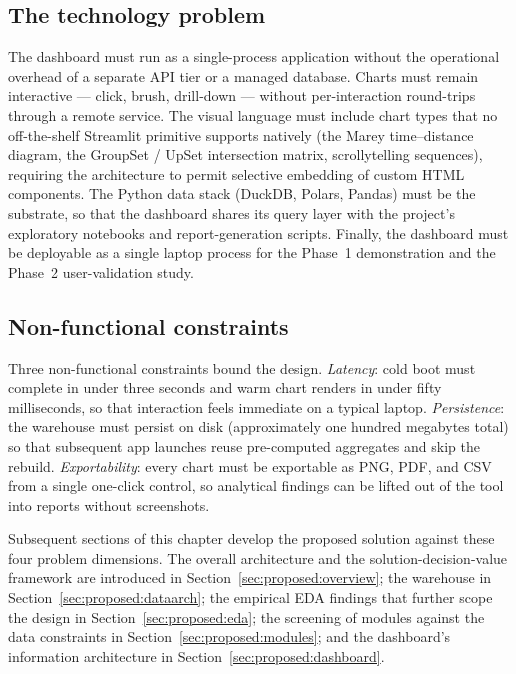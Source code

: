 \subsection{The technology problem}

The dashboard must run as a single-process application without
the operational overhead of a separate API tier or a managed
database. Charts must remain interactive --- click, brush,
drill-down --- without per-interaction round-trips through a
remote service. The visual language must include chart types
that no off-the-shelf Streamlit primitive supports natively (the
Marey time--distance diagram, the GroupSet / UpSet intersection
matrix, scrollytelling sequences), requiring the architecture to
permit selective embedding of custom HTML components. The Python
data stack (DuckDB, Polars, Pandas) must be the substrate, so
that the dashboard shares its query layer with the project's
exploratory notebooks and report-generation scripts. Finally,
the dashboard must be deployable as a single laptop process for
the Phase~1 demonstration and the Phase~2 user-validation study.

\subsection{Non-functional constraints}

Three non-functional constraints bound the design.
\emph{Latency}: cold boot must complete in under three seconds
and warm chart renders in under fifty milliseconds, so that
interaction feels immediate on a typical laptop.
\emph{Persistence}: the warehouse must persist on disk
(approximately one hundred megabytes total) so that subsequent
app launches reuse pre-computed aggregates and skip the rebuild.
\emph{Exportability}: every chart must be exportable as PNG,
PDF, and CSV from a single one-click control, so analytical
findings can be lifted out of the tool into reports without
screenshots.

Subsequent sections of this chapter develop the proposed
solution against these four problem dimensions. The overall
architecture and the solution-decision-value framework are
introduced in Section~\ref{sec:proposed:overview}; the warehouse
in Section~\ref{sec:proposed:dataarch}; the empirical EDA
findings that further scope the design in
Section~\ref{sec:proposed:eda}; the screening of modules against
the data constraints in Section~\ref{sec:proposed:modules}; and
the dashboard's information architecture in
Section~\ref{sec:proposed:dashboard}.

